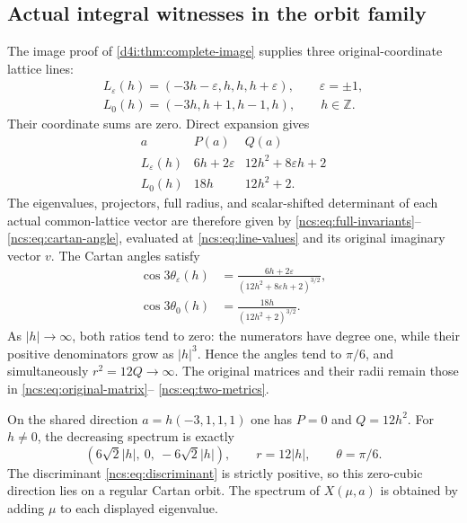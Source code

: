 \documentclass[11pt]{article}
\theoremstyle{definition}
\begin{document}
\subsection{Actual integral witnesses in the orbit family}
\label{ncs:sec:integral-witnesses}

The image proof of \cref{d4i:thm:complete-image} supplies three
original-coordinate lattice lines:
\begin{equation}
 \begin{gathered}
 L_\varepsilon(h)=(-3h-\varepsilon,h,h,h+\varepsilon),
       \qquad\varepsilon=\pm1,\\
 L_0(h)=(-3h,h+1,h-1,h),\qquad h\in\mathbb Z.
 \end{gathered}
 \label{ncs:eq:integral-lines}\tag{NCS20}
\end{equation}
Their coordinate sums are zero. Direct expansion gives
\begin{equation}
 \begin{array}{c|c|c}
 a&P(a)&Q(a)\\\hline
 L_\varepsilon(h)&6h+2\varepsilon&12h^2+8\varepsilon h+2\\
 L_0(h)&18h&12h^2+2.
 \end{array}
 \label{ncs:eq:line-values}\tag{NCS21}
\end{equation}
The eigenvalues, projectors, full radius, and scalar-shifted
determinant of each actual common-lattice vector are therefore
given by \eqref{ncs:eq:full-invariants}--
\eqref{ncs:eq:cartan-angle}, evaluated at
\eqref{ncs:eq:line-values} and its original imaginary vector $v$.
The Cartan angles satisfy
\begin{equation}
 \begin{aligned}
 \cos3\theta_\varepsilon(h)
    &=\frac{6h+2\varepsilon}
                  {(12h^2+8\varepsilon h+2)^{3/2}},\\
 \cos3\theta_0(h)&=\frac{18h}{(12h^2+2)^{3/2}}.
 \end{aligned}
 \label{ncs:eq:line-angles}\tag{NCS22}
\end{equation}
As $|h|\to\infty$, both ratios tend to zero: the numerators
have degree one, while their positive denominators grow as
$|h|^3$. Hence the angles tend to $\pi/6$, and simultaneously
$r^2=12Q\to\infty$. The original matrices and their radii
remain those in \eqref{ncs:eq:original-matrix}--
\eqref{ncs:eq:two-metrics}.

On the shared direction $a=h(-3,1,1,1)$ one has $P=0$ and
$Q=12h^2$. For $h\ne0$, the decreasing spectrum is exactly
\begin{equation}
 (6\sqrt2|h|,\ 0,\ -6\sqrt2|h|),\qquad
 r=12|h|,\qquad\theta=\pi/6.
 \label{ncs:eq:zero-cubic-direction}\tag{NCS23}
\end{equation}
The discriminant \eqref{ncs:eq:discriminant} is strictly positive,
so this zero-cubic direction lies on a regular Cartan orbit.
The spectrum of $X(\mu,a)$ is obtained by adding $\mu$ to each
displayed eigenvalue.
\end{document}

